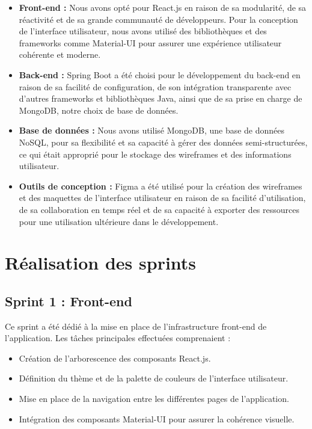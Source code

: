 \begin{itemize}
    \item \textbf{Front-end :} Nous avons opté pour React.js en raison de sa modularité, de sa réactivité et de sa grande communauté de développeurs. Pour la conception de l'interface utilisateur, nous avons utilisé des bibliothèques et des frameworks comme Material-UI pour assurer une expérience utilisateur cohérente et moderne.
    \item \textbf{Back-end :} Spring Boot a été choisi pour le développement du back-end en raison de sa facilité de configuration, de son intégration transparente avec d'autres frameworks et bibliothèques Java, ainsi que de sa prise en charge de MongoDB, notre choix de base de données.
    \item \textbf{Base de données :} Nous avons utilisé MongoDB, une base de données NoSQL, pour sa flexibilité et sa capacité à gérer des données semi-structurées, ce qui était approprié pour le stockage des wireframes et des informations utilisateur.
    \item \textbf{Outils de conception :} Figma a été utilisé pour la création des wireframes et des maquettes de l'interface utilisateur en raison de sa facilité d'utilisation, de sa collaboration en temps réel et de sa capacité à exporter des ressources pour une utilisation ultérieure dans le développement.
\end{itemize}

\section{Réalisation des sprints}

\subsection{Sprint 1 : Front-end}

Ce sprint a été dédié à la mise en place de l'infrastructure front-end de l'application. Les tâches principales effectuées comprenaient :

\begin{itemize}
    \item Création de l'arborescence des composants React.js.
    \item Définition du thème et de la palette de couleurs de l'interface utilisateur.
    \item Mise en place de la navigation entre les différentes pages de l'application.
    \item Intégration des composants Material-UI pour assurer la cohérence visuelle.
\end{itemize}

